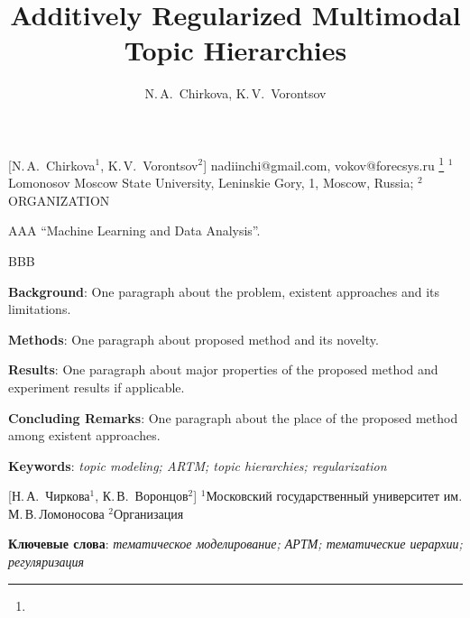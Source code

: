 \documentclass[12pt, twoside]{article}
\begin{document}
\English

\title
	[] %
    {Additively Regularized Multimodal Topic Hierarchies} %
\author
	[] %
	{N.\,A.~Chirkova, K.\,V.~Vorontsov} %
    [N.\,A.~Chirkova$^1$, K.\,V.~Vorontsov$^2$] %
\email
    {nadiinchi@gmail.com, vokov@forecsys.ru}
\thanks
    {}
\organization
    {$^1$Lomonosov Moscow State University, Leninskie Gory, 1, Moscow, Russia;
     $^2$ORGANIZATION}
\abstract
    {AAA ``Machine Learning and Data Analysis''.
		
	\noindent
	BBB


	
	\noindent
	\textbf{Background}:	One paragraph about the problem, existent approaches and its limitations.
	
	\noindent
	\textbf{Methods}: One paragraph about proposed method and its novelty.
	
	\noindent
	\textbf{Results}: One paragraph about major properties of the proposed method and experiment results if applicable.
	
	\noindent
	\textbf{Concluding Remarks}: One paragraph about the place of the proposed method among existent approaches.
		
	\noindent
    	\textbf{Keywords}: \emph{topic modeling; ARTM; topic hierarchies; regularization}}

    [Н.\,А.~Чиркова$^1$, К.\,В.~Воронцов$^2$] %
\thanksRus
    {}
\organizationRus
    {$^1$Московский государственный университет им. М.\,В.\,Ломоносова $^2$Организация}
\abstractRus
    {
	
\bigskip
\noindent
\textbf{Ключевые слова}: \emph {тематическое моделирование; АРТМ;  тематические иерархии; регуляризация}
}
\end{document}
